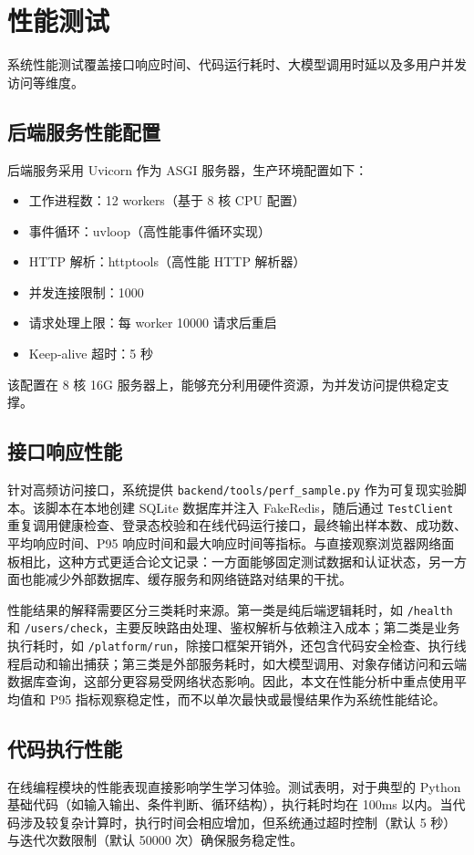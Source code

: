 \section{性能测试}
系统性能测试覆盖接口响应时间、代码运行耗时、大模型调用时延以及多用户并发访问等维度。

\subsection{后端服务性能配置}
后端服务采用 Uvicorn 作为 ASGI 服务器，生产环境配置如下：
\begin{itemize}
  \item 工作进程数：12 workers（基于 8 核 CPU 配置）
  \item 事件循环：uvloop（高性能事件循环实现）
  \item HTTP 解析：httptools（高性能 HTTP 解析器）
  \item 并发连接限制：1000
  \item 请求处理上限：每 worker 10000 请求后重启
  \item Keep-alive 超时：5 秒
\end{itemize}

该配置在 8 核 16G 服务器上，能够充分利用硬件资源，为并发访问提供稳定支撑。

\subsection{接口响应性能}
针对高频访问接口，系统提供 \texttt{backend/tools/perf\_sample.py} 作为可复现实验脚本。该脚本在本地创建 SQLite 数据库并注入 FakeRedis，随后通过 \texttt{TestClient} 重复调用健康检查、登录态校验和在线代码运行接口，最终输出样本数、成功数、平均响应时间、P95 响应时间和最大响应时间等指标。与直接观察浏览器网络面板相比，这种方式更适合论文记录：一方面能够固定测试数据和认证状态，另一方面也能减少外部数据库、缓存服务和网络链路对结果的干扰。

性能结果的解释需要区分三类耗时来源。第一类是纯后端逻辑耗时，如 \texttt{/health} 和 \texttt{/users/check}，主要反映路由处理、鉴权解析与依赖注入成本；第二类是业务执行耗时，如 \texttt{/platform/run}，除接口框架开销外，还包含代码安全检查、执行线程启动和输出捕获；第三类是外部服务耗时，如大模型调用、对象存储访问和云端数据库查询，这部分更容易受网络状态影响。因此，本文在性能分析中重点使用平均值和 P95 指标观察稳定性，而不以单次最快或最慢结果作为系统性能结论。

\subsection{代码执行性能}
在线编程模块的性能表现直接影响学生学习体验。测试表明，对于典型的 Python 基础代码（如输入输出、条件判断、循环结构），执行耗时均在 100ms 以内。当代码涉及较复杂计算时，执行时间会相应增加，但系统通过超时控制（默认 5 秒）与迭代次数限制（默认 50000 次）确保服务稳定性。


